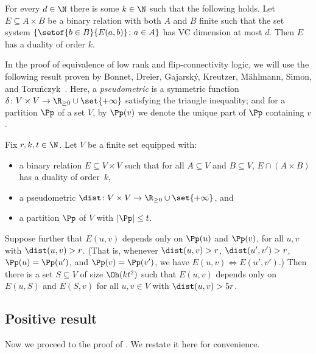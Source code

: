 \begin{theorem}
    \label{thm:vc-dim-duality}
    For every $d \in \N$ there is some $k \in \N$ such that the following holds.
    Let $E \subseteq A \times B$ be a binary relation with both $A$ and $B$ finite such that the set system $\{\setof{b \in B}{E(a, b)}\colon a \in A\}$ has VC dimension at most $d$.
    Then $E$ has a duality of order $k$.
\end{theorem}

In the proof of equivalence of low rank \mso and flip-connectivity logic, we will use the following result proven by Bonnet, Dreier, Gajarsk\'y, Kreutzer, M\"ahlmann, Simon, and Toru\'nczyk~\cite{incremental-lemma}.
Here, a {\em{pseudometric}} is a symmetric function $\delta\colon V \times V \to \R_{\geq 0} \cup \set{+\infty}$ satisfying the triangle inequality; and for a partition $\Pp$ of a set $V$, by $\Pp(v)$ we denote the unique part of $\Pp$ containing $v$.

\begin{theorem}
    \label{thm:incremental-lemma}
    Fix $r, k, t \in \N$.
    Let $V$ be a finite set equipped with:
    \begin{itemize}[nosep]
        \item a binary relation $E \subseteq V \times V$ such that for all $A \subseteq V$ and $B \subseteq V$, $E \cap (A \times B)$ has a duality of order~$k$,
        \item a pseudometric $\dist\colon V \times V \to \R_{\geq 0} \cup \set{+\infty}$, and
        \item a partition $\Pp$ of $V$ with $|\Pp| \leq t$.
    \end{itemize}
    Suppose further that $E(u, v)$ depends only on $\Pp(u)$ and $\Pp(v)$, for all $u, v$ with $\dist(u, v) > r$. (That is, whenever $\dist(u,v)>r$, $\dist(u',v')>r$, $\Pp(u)=\Pp(u')$, and $\Pp(v)=\Pp(v')$, we have $E(u,v)\iff E(u',v')$.)
    Then there is a set $S \subseteq V$ of size $\Oh(kt^2)$ such that $E(u, v)$ depends only on $E(u, S)$ and $E(S, v)$ for all $u, v \in V$ with $\dist(u, v) > 5r$.
\end{theorem}

\subsection{Positive result}

Now we proceed to the proof of .
We restate it here for convenience.
\mainFconnPositive*

